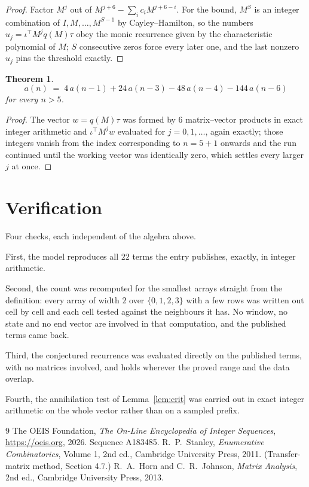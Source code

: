 \documentclass[11pt,a4paper]{article}
\theoremstyle{plain}
\newtheorem{theorem}{Theorem}
\theoremstyle{definition}
\begin{document}
\begin{proof}
Factor $M^{j}$ out of $M^{j+6}-\sum_ic_iM^{j+6-i}$. For the bound, $M^{S}$
is an integer combination of $I,M,\dots,M^{S-1}$ by Cayley--Hamilton, so the numbers
$u_j=\iota^{\!\top}M^{j}q(M)\tau$ obey the monic recurrence given by the characteristic
polynomial of $M$; $S$ consecutive zeros force every later one, and the last nonzero $u_j$
pins the threshold exactly.
\end{proof}

\begin{theorem}
\[
a(n)\;=\;4\,a(n-1) + 24\,a(n-3) - 48\,a(n-4) - 144\,a(n-6)
\]
for every $n>5$.
\end{theorem}

\begin{proof}
The vector $w=q(M)\tau$ was formed by $6$ matrix--vector products in exact integer
arithmetic and $\iota^{\!\top}M^{j}w$ evaluated for $j=0,1,\dots$, again exactly; those
integers vanish from the index corresponding to $n=5+1$ onwards and the run continued
until the working vector was identically zero, which settles every larger $j$ at once.
\end{proof}

\section{Verification}

Four checks, each independent of the algebra above.

First, the model reproduces all $22$ terms the entry publishes, exactly, in integer
arithmetic.

Second, the count was recomputed for the smallest arrays straight from the definition: every
array of width $2$ over $\{0,1,2,3\}$ with a few rows was written out cell by cell and each cell
tested against the neighbours it has. No window, no state and no end vector are involved in that
computation, and the published terms came back.

Third, the conjectured recurrence was evaluated directly on the published terms, with no
matrices involved, and holds wherever the proved range and the data overlap.

Fourth, the annihilation test of Lemma~\ref{lem:crit} was carried out in exact integer
arithmetic on the whole vector rather than on a sampled prefix.

\begin{thebibliography}{9}
 The OEIS Foundation, \emph{The On-Line Encyclopedia of Integer
Sequences}, \url{https://oeis.org}, 2026. Sequence A183485.
 R.~P.~Stanley, \emph{Enumerative Combinatorics}, Volume 1, 2nd ed.,
Cambridge University Press, 2011. (Transfer-matrix method, Section 4.7.)
 R.~A.~Horn and C.~R.~Johnson, \emph{Matrix Analysis}, 2nd ed., Cambridge
University Press, 2013.
\end{thebibliography}
\end{document}
